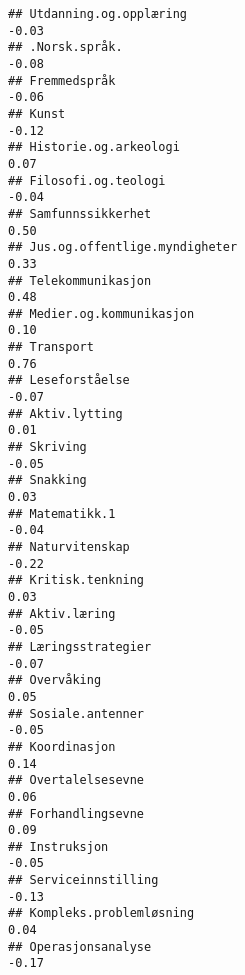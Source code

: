 \documentclass[
]{article}
\begin{document}
\begin{verbatim}
## Utdanning.og.opplæring                                                           -0.03
## .Norsk.språk.                                                                    -0.08
## Fremmedspråk                                                                     -0.06
## Kunst                                                                            -0.12
## Historie.og.arkeologi                                                             0.07
## Filosofi.og.teologi                                                              -0.04
## Samfunnssikkerhet                                                                 0.50
## Jus.og.offentlige.myndigheter                                                     0.33
## Telekommunikasjon                                                                 0.48
## Medier.og.kommunikasjon                                                           0.10
## Transport                                                                         0.76
## Leseforståelse                                                                   -0.07
## Aktiv.lytting                                                                     0.01
## Skriving                                                                         -0.05
## Snakking                                                                          0.03
## Matematikk.1                                                                     -0.04
## Naturvitenskap                                                                   -0.22
## Kritisk.tenkning                                                                  0.03
## Aktiv.læring                                                                     -0.05
## Læringsstrategier                                                                -0.07
## Overvåking                                                                        0.05
## Sosiale.antenner                                                                 -0.05
## Koordinasjon                                                                      0.14
## Overtalelsesevne                                                                  0.06
## Forhandlingsevne                                                                  0.09
## Instruksjon                                                                      -0.05
## Serviceinnstilling                                                               -0.13
## Kompleks.problemløsning                                                           0.04
## Operasjonsanalyse                                                                -0.17

\end{verbatim}
\end{document}
